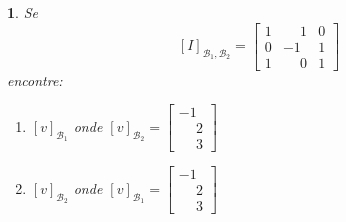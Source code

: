 \documentclass[12pt]{exam}
\newtheorem{exercicio}{}
\begin{document}
\begin{exercicio}
  Se
  \[
    [I]_{\mathcal{B}_1,\mathcal{B}_2} = \begin{bmatrix}
      1 & \phantom{-}1 & 0\\
      0 & -1 & 1\\
      1 & \phantom{-}0 & 1
    \end{bmatrix}
  \]
  encontre:
  \begin{enumerate}[label=({\alph*})]
    \item $[v]_{\mathcal{B}_1}$ onde $[v]_{\mathcal{B}_2} = \begin{bmatrix}
      -1\\\phantom{-}2\\\phantom{-}3
    \end{bmatrix}$
    \item $[v]_{\mathcal{B}_2}$ onde $[v]_{\mathcal{B}_1} = \begin{bmatrix}
      -1\\\phantom{-}2\\\phantom{-}3
    \end{bmatrix}$
  \end{enumerate}
\end{exercicio}
\end{document}
